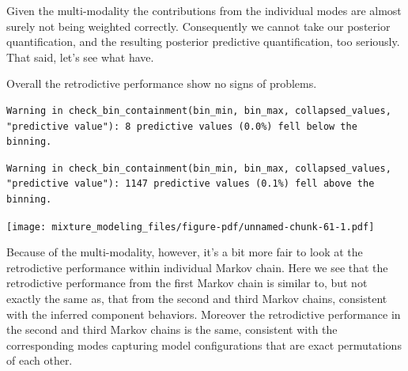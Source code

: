 \documentclass[
  letterpaper,
  DIV=11,
  numbers=noendperiod]{scrartcl}
\newenvironment{Shaded}{\begin{snugshade}}{\end{snugshade}}
\newcommand{\AttributeTok}[1]{\textcolor[rgb]{0.40,0.45,0.13}{#1}}
\newcommand{\DecValTok}[1]{\textcolor[rgb]{0.68,0.00,0.00}{#1}}
\newcommand{\FloatTok}[1]{\textcolor[rgb]{0.68,0.00,0.00}{#1}}
\newcommand{\FunctionTok}[1]{\textcolor[rgb]{0.28,0.35,0.67}{#1}}
\newcommand{\NormalTok}[1]{\textcolor[rgb]{0.00,0.23,0.31}{#1}}
\newcommand{\SpecialCharTok}[1]{\textcolor[rgb]{0.37,0.37,0.37}{#1}}
\newcommand{\StringTok}[1]{\textcolor[rgb]{0.13,0.47,0.30}{#1}}
\begin{document}
Given the multi-modality the contributions from the individual modes are
almost surely not being weighted correctly. Consequently we cannot take
our posterior quantification, and the resulting posterior predictive
quantification, too seriously. That said, let's see what have.

Overall the retrodictive performance show no signs of problems.

\begin{Shaded}
\end{Shaded}

\begin{verbatim}
Warning in check_bin_containment(bin_min, bin_max, collapsed_values,
"predictive value"): 8 predictive values (0.0%) fell below the binning.
\end{verbatim}

\begin{verbatim}
Warning in check_bin_containment(bin_min, bin_max, collapsed_values,
"predictive value"): 1147 predictive values (0.1%) fell above the binning.
\end{verbatim}

\texttt{[image: mixture\_modeling\_files/figure-pdf/unnamed-chunk-61-1.pdf]}

Because of the multi-modality, however, it's a bit more fair to look at
the retrodictive performance within individual Markov chain. Here we see
that the retrodictive performance from the first Markov chain is similar
to, but not exactly the same as, that from the second and third Markov
chains, consistent with the inferred component behaviors. Moreover the
retrodictive performance in the second and third Markov chains is the
same, consistent with the corresponding modes capturing model
configurations that are exact permutations of each other.
\end{document}
